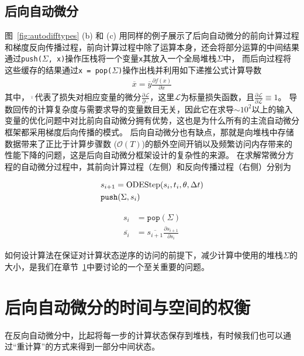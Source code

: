 \documentclass[A4,twoside,fontset=ubuntu,UTF8]{ctexart}
\newcommand{\bigO}{{\mathcal{O}}}
\begin{document}
\subsection{后向自动微分}
图~\ref{fig:autodifftypes} (b) 和 (c) 用同样的例子展示了后向自动微分的前向计算过程和梯度反向传播过程，前向计算过程中除了运算本身，还会将部分运算的中间结果通过\texttt{push($\Sigma$, x)}操作压栈将一个变量\texttt{x}其放入一个全局堆栈$\Sigma$中，
而后向过程将这些缓存的结果通过\texttt{x = pop($\Sigma$)}操作出栈并利用如下递推公式计算导数
\begin{align}
    \overline{x} = \overline{y}\frac{\partial f(x)}{\partial x}
\end{align}
其中，$\overline{\cdot}$代表了损失对相应变量的微分$\frac{\partial \mathcal{L}}{\partial \cdot}$，这里$\mathcal{L}$为标量损失函数，且$\frac{\partial \mathcal L}{\partial \mathcal L}\equiv 1$。
导数回传的计算复杂度与需要求导的变量数目无关，因此它在求导$\sim 10^2$以上的输入变量的优化问题中对比前向自动微分拥有优势，这也是为什么所有的主流自动微分框架都采用梯度后向传播的模式。
后向自动微分也有缺点，那就是向堆栈中存储数据带来了正比于计算步骤数 ($\bigO(T)$)的额外空间开销以及频繁访问内存带来的性能下降的问题，这是后向自动微分框架设计的复杂性的来源。
在求解常微分方程的自动微分过程中，其前向计算过程（左侧）和反向传播过程（右侧）分别为

\begin{minipage}{0.45\textwidth}
\begin{align*}
    &s_{i+1} = {\rm ODEStep}(s_{i}, t_i, \theta, \Delta t)\\
    &\texttt{push}(\Sigma, s_{i})
\end{align*}
\end{minipage}
\begin{minipage}{0.45\textwidth}
\begin{align*}
    s_{i} &= \texttt{pop}(\Sigma)\\
    \overline{s_i} &= \overline{s_{i+1}}\frac{\partial s_{i+1}}{\partial s_{i}}
\end{align*}
\end{minipage}

如何设计算法在保证对计算状态逆序的访问的前提下，减少计算中使用的堆栈$\Sigma$的大小，是我们在章节~\ref{sec:timespace}中要讨论的一个至关重要的问题。

\section{后向自动微分的时间与空间的权衡}\label{sec:timespace}
在反向自动微分中，比起将每一步的计算状态保存到堆栈，有时候我们也可以通过“重计算”的方式来得到一部分中间状态。
\end{document}
